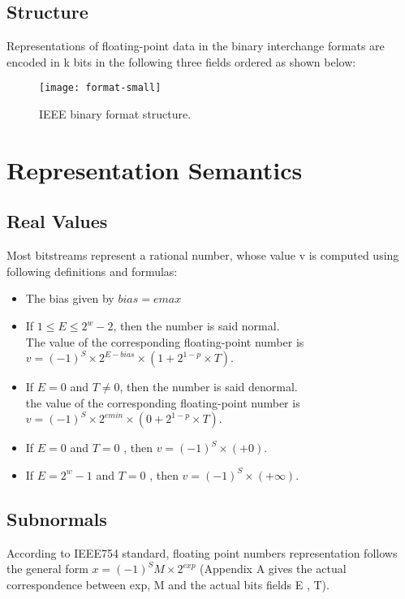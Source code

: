 \subsection{Structure}
Representations of floating-point data in the binary interchange formats are encoded in k bits in the following three fields ordered as shown below:
\begin{figure}[h!]
  \centering
  \texttt{[image: format-small]}
  \caption{IEEE binary format structure.}
  \label{ieee:structure}
\end{figure}

\section{Representation Semantics}

\subsection{Real Values}
Most bitstreams represent a rational number, whose value v is computed using following definitions and formulas:

\begin{itemize}[topsep=0pt]
\item The bias given by $bias=emax$
\item If $1\leq E\leq 2^{w}-2$, then the number is said normal. \\
The value of the corresponding floating-point number is $v=(-1)^{S}\times 2^{{E-bias}}\times (1+2^{{1-p}}\times T)$.
\item If $E=0$ and $T\neq 0$, then the number is said denormal. \\
the value of the corresponding floating-point number is $v=(-1)^{S}\times 2^{{emin}}\times (0+2^{{1-p}}\times T)$.
\item If $E=0$ and $T=0$ , then $v=(-1)^{S}\times (+0)$.
\item If $E=2^{w}-1$ and $T=0$ , then $v=(-1)^{S}\times (+\infty )$.
\end{itemize}

\subsection{Subnormals}
According to IEEE754 standard, floating point numbers representation follows the general form $x=(-1)^S M \times 2^{exp}$ (Appendix A gives the actual correspondence between exp, M and the actual bits fields E , T).

